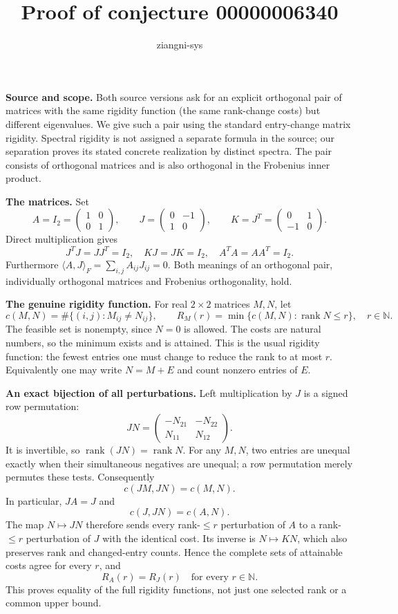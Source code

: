 \documentclass[11pt]{article}
\title{Proof of conjecture 00000006340}
\author{ziangni-sys}
\date{}
\begin{document}
\maketitle
\noindent\textbf{Source and scope.}
Both source versions ask for an explicit orthogonal pair of matrices with the same rigidity function (the same rank-change costs) but different eigenvalues. We give such a pair using the standard entry-change matrix rigidity. Spectral rigidity is not assigned a separate formula in the source; our separation proves its stated concrete realization by distinct spectra. The pair consists of orthogonal matrices and is also orthogonal in the Frobenius inner product.

\medskip
\noindent\textbf{The matrices.}
Set
\[
 A=I_2=\begin{pmatrix}1&0\\0&1\end{pmatrix},
 \qquad J=\begin{pmatrix}0&-1\\1&0\end{pmatrix},
 \qquad K=J^T=\begin{pmatrix}0&1\\-1&0\end{pmatrix}.
\]
Direct multiplication gives
\[
 J^TJ=JJ^T=I_2,\quad KJ=JK=I_2,\quad
 A^TA=AA^T=I_2.
\]
Furthermore $\langle A,J\rangle_F=\sum_{i,j}A_{ij}J_{ij}=0$.
Both meanings of an orthogonal pair, individually orthogonal matrices and Frobenius orthogonality, hold.

\medskip
\noindent\textbf{The genuine rigidity function.}
For real $2\times2$ matrices $M,N$, let
\[
 c(M,N)=\#\{(i,j):M_{ij}\ne N_{ij}\},\qquad
 R_M(r)=\min\{c(M,N):\operatorname{rank}N\le r\},
 \quad r\in\mathbb N.
\]
The feasible set is nonempty, since $N=0$ is allowed. The costs are natural numbers, so the minimum exists and is attained. This is the usual rigidity function: the fewest entries one must change to reduce the rank to at most $r$. Equivalently one may write $N=M+E$ and count nonzero entries of $E$.

\medskip
\noindent\textbf{An exact bijection of all perturbations.}
Left multiplication by $J$ is a signed row permutation:
\[
 JN=\begin{pmatrix}-N_{21}&-N_{22}\\N_{11}&N_{12}\end{pmatrix}.
\]
It is invertible, so $\operatorname{rank}(JN)=\operatorname{rank}N$.
For any $M,N$, two entries are unequal exactly when their simultaneous negatives are unequal; a row permutation merely permutes these tests. Consequently
\[
 c(JM,JN)=c(M,N).
\]
In particular, $JA=J$ and
\[
 c(J,JN)=c(A,N).
\]
The map $N\mapsto JN$ therefore sends every rank-$\le r$ perturbation of $A$ to a rank-$\le r$ perturbation of $J$ with the identical cost. Its inverse is $N\mapsto KN$, which also preserves rank and changed-entry counts. Hence the complete sets of attainable costs agree for every $r$, and
\[
 \boxed{R_A(r)=R_J(r)\quad\text{for every }r\in\mathbb N.}
\]
This proves equality of the full rigidity functions, not just one selected rank or a common upper bound.
\end{document}
